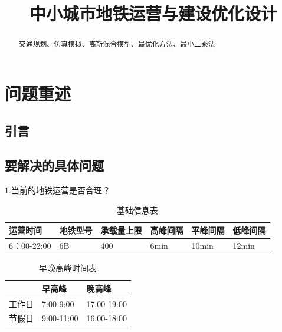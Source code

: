 \documentclass[12pt,a4paper]{mcmthesis}
\title{中小城市地铁运营与建设优化设计}
\date{}
\begin{document}
    \begin{abstract}
        

        \begin{keywords}
        {\song\xiaosihao 交通规划、仿真模拟、高斯混合模型、最优化方法、最小二乘法}
        \end{keywords}
    \end{abstract}
    \maketitle
    \renewcommand{\contentsname}{\centerline{\sanhao\bfseries\HEI 目\quad 录}}
    \tableofcontents

    \newpage
    \setcounter{page}{1}


    \section{问题重述}

    \subsection{引言}
    

    \subsection{要解决的具体问题}

    1.当前的地铁运营是否合理？

    \begin{table}
        \centering
        \begin{tabular}{|l|l|l|l|l|l|}
            \hline
            运营时间       & 地铁型号 & 承载量上限 & 高峰间隔 & 平峰间隔  & 低峰间隔  \\ \hline
            6：00-22:00 & 6B   & 400   & 6min & 10min & 12min \\ \hline
        \end{tabular}
        \caption{基础信息表}
        \label{tab:基础信息表}
    \end{table}

    \begin{table}
        \centering
        \begin{tabular}{|l|l|l|}
            \hline
            & 早高峰        & 晚高峰         \\ \hline
            工作日 & 7:00-9:00  & 17:00-19:00 \\ \hline
            节假日 & 9:00-11:00 & 16:00-18:00 \\ \hline
        \end{tabular}
        \caption{早晚高峰时间表}
        \label{tab:早晚高峰}
    \end{table}
\end{document}
